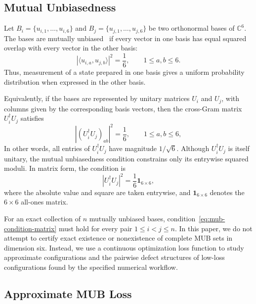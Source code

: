 \documentclass[a4paper,twocolumn,11pt,amsfonts,amssymb]{quantumarticle}
\begin{document}
\subsection{Mutual Unbiasedness}

Let $B_i=\{u_{i,1},\ldots,u_{i,6}\}$ and $B_j=\{u_{j,1},\ldots,u_{j,6}\}$ be two orthonormal bases of $\mathbb{C}^6$. The bases are mutually unbiased~\cite{WOOTTERS1989optimalStateMUB} if every vector in one basis has equal squared overlap with every vector in the other basis:
\begin{equation}
    |\langle u_{i,a}, u_{j,b} \rangle|^2 = \frac{1}{6},
    \qquad
    1 \leq a,b \leq 6.
    \label{eq:mub-condition-vector}
\end{equation}
Thus, measurement of a state prepared in one basis gives a uniform probability distribution when expressed in the other basis.

Equivalently, if the bases are represented by unitary matrices $U_i$ and $U_j$, with columns given by the corresponding basis vectors, then the cross-Gram matrix $U_i^\dagger U_j$ satisfies
\begin{equation}
    |(U_i^\dagger U_j)_{ab}|^2 = \frac{1}{6},
    \qquad 1 \le a,b \le 6,
\end{equation}
In other words, all entries of $U_i^\dagger U_j$ have magnitude $1/\sqrt{6}$. Although $U_i^\dagger U_j$ is itself unitary, the mutual unbiasedness condition constrains only its entrywise squared moduli. In matrix form, the condition is
\begin{equation}
    |U_i^\dagger U_j|^2 = \frac{1}{6}\mathbf{1}_{6\times6},
    \label{eq:mub-condition-matrix}
\end{equation}
where the absolute value and square are taken entrywise, and $\mathbf{1}_{6 \times 6}$ denotes the $6 \times 6$ all-ones matrix.


For an exact collection of $n$ mutually unbiased bases, condition~\eqref{eq:mub-condition-matrix} must hold for every pair $1 \leq i < j \leq n$. In this paper, we do not attempt to certify exact existence or nonexistence of complete MUB sets in dimension six. Instead, we use a continuous optimization loss function to study approximate configurations and the pairwise defect structures of low-loss configurations found by the specified numerical workflow.

\subsection{Approximate MUB Loss}
\end{document}
